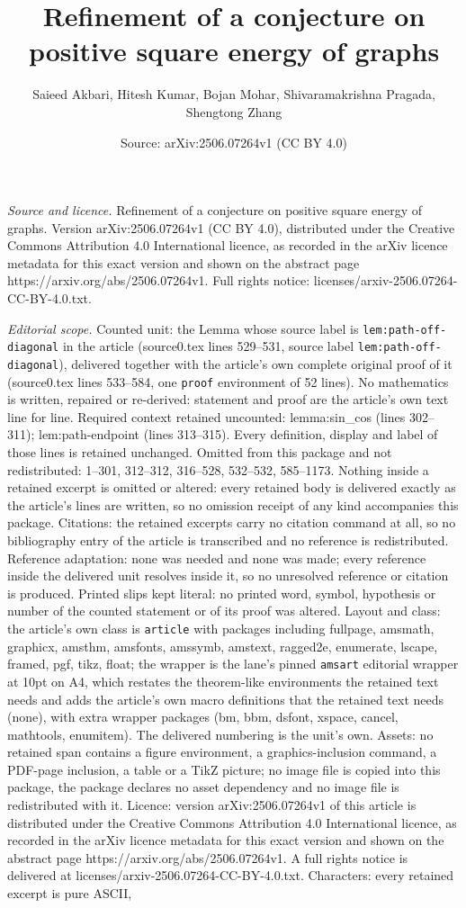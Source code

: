 \documentclass[10pt,a4paper]{amsart}
\title[Refinement of a conjecture on positive square energy of grap]{Refinement of a conjecture on positive square energy of graphs}
\author{Saieed Akbari, Hitesh Kumar, Bojan Mohar, Shivaramakrishna Pragada, Shengtong Zhang}
\date{Source: arXiv:2506.07264v1 (CC BY 4.0)}
\begin{document}
\maketitle

\noindent\emph{Source and licence.} Refinement of a conjecture on positive square energy of graphs. Version arXiv:2506.07264v1 (CC BY 4.0), distributed under the Creative Commons Attribution 4.0 International licence, as recorded in the arXiv licence metadata for this exact version and shown on the abstract page https://arxiv.org/abs/2506.07264v1. Full rights notice: licenses/arxiv-2506.07264-CC-BY-4.0.txt.\par\smallskip

\noindent\textit{Editorial scope.} Counted unit: the Lemma whose source label is \texttt{lem:path-off-diagonal} in the article (source0.tex lines 529--531, source label \texttt{lem:path-off-diagonal}), delivered together with the article's own complete original proof of it (source0.tex lines 533--584, one \texttt{proof} environment of 52 lines). No mathematics is written, repaired or re-derived: statement and proof are the article's own text line for line. Required context retained uncounted: lemma:sin\_cos (lines 302--311); lem:path-endpoint (lines 313--315). Every definition, display and label of those lines is retained unchanged. Omitted from this package and not redistributed: 1--301, 312--312, 316--528, 532--532, 585--1173. Nothing inside a retained excerpt is omitted or altered: every retained body is delivered exactly as the article's lines are written, so no omission receipt of any kind accompanies this package. Citations: the retained excerpts carry no citation command at all, so no bibliography entry of the article is transcribed and no reference is redistributed. Reference adaptation: none was needed and none was made; every reference inside the delivered unit resolves inside it, so no unresolved reference or citation is produced. Printed slips kept literal: no printed word, symbol, hypothesis or number of the counted statement or of its proof was altered. Layout and class: the article's own class is \texttt{article} with packages including fullpage, amsmath, graphicx, amsthm, amsfonts, amssymb, amstext, ragged2e, enumerate, lscape, framed, pgf, tikz, float; the wrapper is the lane's pinned \texttt{amsart} editorial wrapper at 10pt on A4, which restates the theorem-like environments the retained text needs and adds the article's own macro definitions that the retained text needs (none), with extra wrapper packages (bm, bbm, dsfont, xspace, cancel, mathtools, enumitem). The delivered numbering is the unit's own. Assets: no retained span contains a figure environment, a graphics-inclusion command, a PDF-page inclusion, a table or a TikZ picture; no image file is copied into this package, the package declares no asset dependency and no image file is redistributed with it. Licence: version arXiv:2506.07264v1 of this article is distributed under the Creative Commons Attribution 4.0 International licence, as recorded in the arXiv licence metadata for this exact version and shown on the abstract page https://arxiv.org/abs/2506.07264v1. A full rights notice is delivered at licenses/arxiv-2506.07264-CC-BY-4.0.txt. Characters: every retained excerpt is pure ASCII, 
\end{document}
